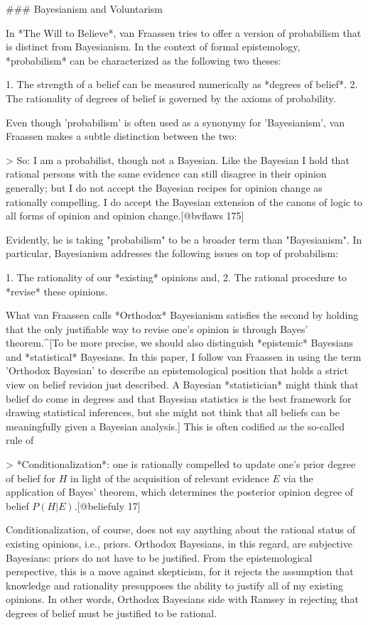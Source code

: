 \#\#\# Bayesianism and Voluntarism

In *The Will to Believe*, van Fraassen tries to offer a version of
probabilism that is distinct from Bayesianism. In the context of formal
epistemology, *probabilism* can be characterized as the following two
theses:

1. The strength of a belief can be measured numerically as *degrees of
belief*. 2. The rationality of degrees of belief is governed by the
axioms of probability.

Even though 'probabilism' is often used as a synonymy for 'Bayesianism',
van Fraassen makes a subtle distinction between the two:

\textgreater{} So: I am a probabilist, though not a Bayesian. Like the
Bayesian I hold that rational persons with the same evidence can still
disagree in their opinion generally; but I do not accept the Bayesian
recipes for opinion change as rationally compelling. I do accept the
Bayesian extension of the canons of logic to all forms of opinion and
opinion change.{[}@bvflaws 175{]}

Evidently, he is taking "probabilism" to be a broader term than
"Bayesianism". In particular, Bayesianism addresses the following issues
on top of probabilism:

1. The rationality of our *existing* opinions and, 2. The rational
procedure to *revise* these opinions.

What van Fraassen calls *Orthodox* Bayesianism satisfies the second by
holding that the only justifiable way to revise one's opinion is through
Bayes' theorem.\^{}{[}To be more precise, we should also distinguish
*epistemic* Bayesians and *statistical* Bayesians. In this paper, I
follow van Fraassen in using the term 'Orthodox Bayesian' to describe an
epistemological position that holds a strict view on belief revision
just described. A Bayesian *statistician* might think that belief do
come in degrees and that Bayesian statistics is the best framework for
drawing statistical inferences, but she might not think that all beliefs
can be meaningfully given a Bayesian analysis.{]} This is often codified
as the so-called rule of

\textgreater{} *Conditionalization*: one is rationally compelled to
update one's prior degree of belief for \(H\) in light of the
acquisition of relevant evidence \(E\) via the application of Bayes'
theorem, which determines the posterior opinion degree of belief
\(P(H|E)\).{[}@beliefuly 17{]}

Conditionalization, of course, does not say anything about the rational
status of existing opinions, i.e., priors. Orthodox Bayesians, in this
regard, are subjective Bayesians: priors do not have to be justified.
From the epistemological perspective, this is a move against skepticism,
for it rejects the assumption that knowledge and rationality presupposes
the ability to justify all of my existing opinions. In other words,
Orthodox Bayesians side with Ramsey in rejecting that degrees of belief
must be justified to be rational.

